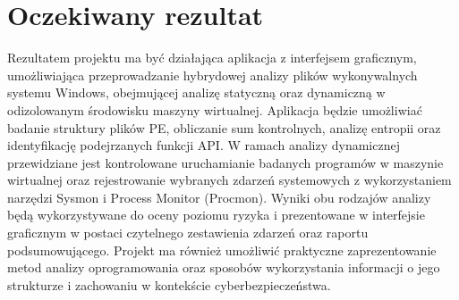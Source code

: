\documentclass{article}
\begin{document}
\section{Oczekiwany rezultat}
\label{sec:rezultat}
Rezultatem projektu ma być działająca aplikacja z interfejsem graficznym, umożliwiająca przeprowadzanie hybrydowej analizy plików wykonywalnych systemu Windows, obejmującej analizę statyczną oraz dynamiczną w odizolowanym środowisku maszyny wirtualnej. Aplikacja będzie umożliwiać badanie struktury plików PE, obliczanie sum kontrolnych, analizę entropii oraz identyfikację podejrzanych funkcji API. W ramach analizy dynamicznej przewidziane jest kontrolowane uruchamianie badanych programów w maszynie wirtualnej oraz rejestrowanie wybranych zdarzeń systemowych z wykorzystaniem narzędzi Sysmon i Process Monitor (Procmon).
Wyniki obu rodzajów analizy będą wykorzystywane do oceny poziomu ryzyka i prezentowane w interfejsie graficznym w postaci czytelnego zestawienia zdarzeń oraz raportu podsumowującego. Projekt ma również umożliwić praktyczne zaprezentowanie metod analizy oprogramowania oraz sposobów wykorzystania informacji o jego strukturze i zachowaniu w kontekście cyberbezpieczeństwa.
\end{document}

